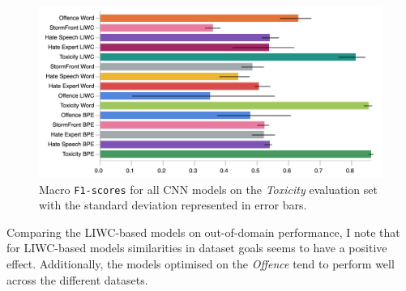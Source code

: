 \begin{figure}
    \centering
    \includegraphics[width=\textwidth]{all_cnn_wulczyn_test.pdf}
    \caption{Macro \texttt{F1-scores} for all CNN models on the \textit{Toxicity} evaluation set with the standard deviation represented in error bars.}
    \label{fig:wulczyn_cnn_test}
\end{figure}

Comparing the LIWC-based models on out-of-domain performance, I note that for LIWC-based models similarities in dataset goals seems to have a positive effect.
Additionally, the models optimised on the \textit{Offence} tend to perform well across the different datasets.


